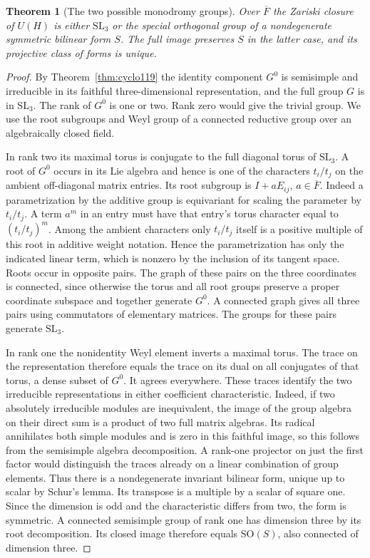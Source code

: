 \documentclass[a4paper,11pt]{article}
\newtheorem{theorem}[proposition]{Theorem}
\theoremstyle{definition}
\theoremstyle{remark}
\numberwithin{equation}{section}
\begin{document}
\begin{theorem}[The two possible monodromy groups]
\label{thm:orth122}
Over \(\overline F\) the Zariski closure of \(U(H)\) is
either \(\mathrm{SL}_3\) or the special orthogonal group of a
nondegenerate symmetric bilinear form \(S\). The full image
preserves \(S\) in the latter case, and its projective class
of forms is unique.
\end{theorem}
\begin{proof}
By Theorem~\ref{thm:cyclo119} the identity component \(G^0\)
is semisimple and irreducible in its faithful three-dimensional
representation, and the full group \(G\) is in \(\mathrm{SL}_3\).
The rank of \(G^0\) is one or two. Rank zero would give the
trivial group. We use the root subgroups and Weyl group of a
connected reductive group over an algebraically closed
field.~\cite{VI-IV-VI-milne122}

In rank two its maximal torus is conjugate to the full diagonal
torus of \(\mathrm{SL}_3\). A root of \(G^0\) occurs in its Lie
algebra and hence is one of the characters \(t_i/t_j\) on
the ambient off-diagonal matrix entries. Its root subgroup is
\(I+aE_{ij}\), \(a\in\overline F\). Indeed a parametrization
by the additive group is equivariant for scaling the parameter
by \(t_i/t_j\). A term \(a^m\) in an entry must have that
entry's torus character equal to \((t_i/t_j)^m\). Among
the ambient characters only \(t_i/t_j\) itself is a positive
multiple of this root in additive weight notation. Hence the
parametrization has only the indicated linear term, which is
nonzero by the inclusion of its tangent space. Roots occur in
opposite pairs. The graph of these pairs on the three coordinates
is connected, since otherwise the torus and all root groups
preserve a proper coordinate subspace and together generate
\(G^0\). A connected graph gives all three pairs using
commutators of elementary matrices. The groups for these
pairs generate \(\mathrm{SL}_3\).

In rank one the nonidentity Weyl element inverts a maximal
torus. The trace on the representation therefore equals the
trace on its dual on all conjugates of that torus, a dense
subset of \(G^0\). It agrees everywhere. These traces identify
the two irreducible representations in either coefficient
characteristic. Indeed, if two absolutely irreducible modules
are inequivalent, the image of the group algebra on their
direct sum is a product of two full matrix algebras. Its
radical annihilates both simple modules and is zero in this
faithful image, so this follows from the semisimple algebra
decomposition. A rank-one projector on just the first factor
would distinguish the traces already on a linear combination
of group elements. Thus there is a nondegenerate invariant
bilinear form, unique up to scalar by Schur's lemma. Its
transpose is a multiple by a scalar of square one. Since the
dimension is odd and the characteristic differs from two,
the form is symmetric. A connected semisimple group of rank
one has dimension three by its root decomposition. Its closed
image therefore equals \(\mathrm{SO}(S)\), also connected of
dimension three.


\end{proof}
\end{document}
